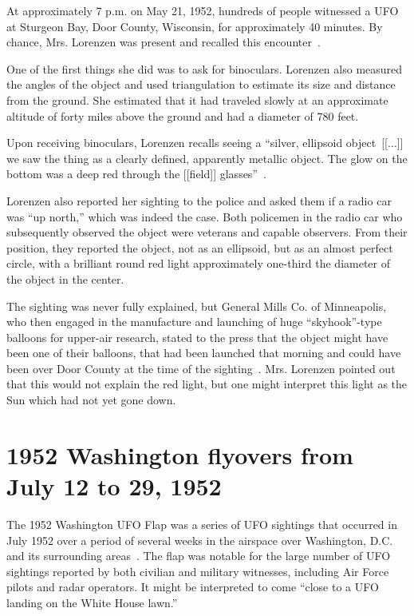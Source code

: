 
At approximately 7 p.m. on May 21, 1952, hundreds of people witnessed a UFO at Sturgeon Bay, Door County, Wisconsin, for approximately 40 minutes.
By chance, Mrs. Lorenzen was present and recalled this encounter~\cite[Chapter~3]{Lorenzen1966Jan}.

One of the first things she did was to ask for binoculars. Lorenzen also measured the angles of the object and used triangulation to estimate its size and distance from the ground. She estimated that it had traveled slowly at an approximate altitude of
forty miles above the ground and had a diameter of 780 feet.

Upon receiving binoculars, Lorenzen recalls seeing a ``silver, ellipsoid object~[[$\ldots$]] we saw the thing as a clearly
defined, apparently metallic object. The glow on the bottom
was a deep red through the [[field]] glasses''~\cite[pp.~31,~33]{Lorenzen1966Jan}.

Lorenzen also reported her sighting to the police and asked them if a radio car was ``up north,''
which was indeed the case. Both policemen in the radio car who subsequently observed the object were veterans and capable observers.
From their position, they reported the object, not as an ellipsoid, but as an almost perfect circle,
with a brilliant round red light approximately one-third the diameter of the object in the center.


The sighting was never fully explained, but General Mills Co. of Minneapolis,
who then engaged in the manufacture and launching of huge ``skyhook''-type balloons for upper-air research,
stated to the press that the object might have been one of their balloons,
that had been launched that morning and could have been over Door County at the time of the sighting~\cite[p.~34]{Lorenzen1966Jan}.
Mrs. Lorenzen pointed out that this would not explain the red light,
but one might interpret this light as the Sun which had not yet gone down.

\section{1952 Washington flyovers from July 12 to 29, 1952}
\label{2023-UFO-part-History-chapter-post-1945-pre-1953-WF52}

The 1952 Washington UFO Flap was a series of UFO sightings that occurred in July 1952 over a period of several weeks in the airspace over Washington, D.C. and its surrounding areas~\cite{Ruppelt2011May}. The flap was notable for the large number of UFO sightings reported by both civilian and military witnesses, including Air Force pilots and radar operators.
It might be interpreted to come ``close to a UFO landing on the White House lawn.''

